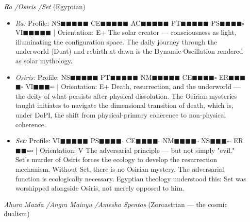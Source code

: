 \textit{Ra /\allowbreak  Osiris /\allowbreak  Set} (Egyptian)

\begin{itemize}[nosep,leftmargin=*]
  \item \textit{Ra:} Profile: NS$\blacksquare$$\blacksquare$$\blacksquare$$\blacksquare$$\blacksquare$ CE$\blacksquare$$\blacksquare$$\blacksquare$$\blacksquare$$\blacksquare$ AC$\blacksquare$$\blacksquare$$\blacksquare$$\blacksquare$$\blacksquare$ PT$\blacksquare$$\blacksquare$$\blacksquare$$\blacksquare$$\blacksquare$ PS$\blacksquare$$\blacksquare$$\blacksquare$$\blacksquare$$\square$ VI$\blacksquare$$\blacksquare$$\blacksquare$$\blacksquare$$\blacksquare$ | Orientation: E+ The solar creator — consciousness as light, illuminating the configuration space. The daily journey through the underworld (Duat) and rebirth at dawn is the Dynamic Oscillation rendered as solar mythology.
  \item \textit{Osiris:} Profile: NS$\blacksquare$$\blacksquare$$\blacksquare$$\blacksquare$$\blacksquare$ PT$\blacksquare$$\blacksquare$$\blacksquare$$\blacksquare$$\blacksquare$ NM$\blacksquare$$\blacksquare$$\blacksquare$$\blacksquare$$\blacksquare$ CE$\blacksquare$$\blacksquare$$\blacksquare$$\blacksquare$$\square$ ER$\blacksquare$$\blacksquare$$\blacksquare$$\blacksquare$$\square$ VI$\blacksquare$$\blacksquare$$\blacksquare$$\square$$\square$ | Orientation: E+ Death, resurrection, and the underworld — the deity of what persists after physical dissolution. The Osirian mysteries taught initiates to navigate the dimensional transition of death, which is, under DoPI, the shift from physical-primary coherence to non-physical coherence.
  \item \textit{Set:} Profile: VI$\blacksquare$$\blacksquare$$\blacksquare$$\blacksquare$$\blacksquare$ PS$\blacksquare$$\blacksquare$$\blacksquare$$\blacksquare$$\square$ CE$\blacksquare$$\blacksquare$$\blacksquare$$\blacksquare$$\square$ NM$\blacksquare$$\blacksquare$$\blacksquare$$\blacksquare$$\square$ NS$\blacksquare$$\blacksquare$$\blacksquare$$\square$$\square$ ER$\blacksquare$$\blacksquare$$\square$$\square$$\square$ | Orientation: V The adversarial principle — but not simply "evil." Set's murder of Osiris forces the ecology to develop the resurrection mechanism. Without Set, there is no Osirian mystery. The adversarial function is ecologically necessary. Egyptian theology understood this: Set was worshipped alongside Osiris, not merely opposed to him.
\end{itemize}


\textit{Ahura Mazda /\allowbreak  Angra Mainyu /\allowbreak  Amesha Spentas} (Zoroastrian — the cosmic dualism)


